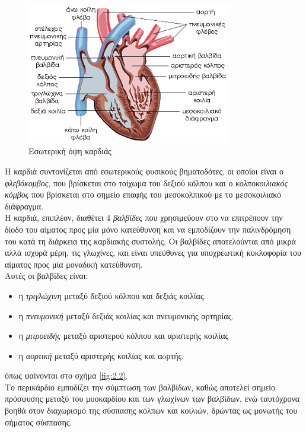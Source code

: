 \begin{figure}[H]
    \centering
    \includegraphics[width=0.8\textwidth]{misc/heart-anatomy.png}
    \caption{Εσωτερική όψη καρδιάς}
    \label{fig:2.1}
\end{figure}
\noindent Η καρδιά συντονίζεται από εσωτερικούς φυσικούς βηματοδότες, οι οποίοι είναι ο \emph{φλεβόκομβος}, που βρίσκεται στο τοίχωμα του δεξιού κόλπου και ο \emph{κολποκοιλιακός κόμβος} που βρίσκεται στο σημείο επαφής του μεσοκολπικού με το μεσοκοιλιακό διάφραγμα.
\\[0.5 \baselineskip]
Η καρδιά, επιπλέον, διαθέτει 4 \emph{βαλβίδες} που χρησιμεύουν στο να επιτρέπουν την δίοδο του αίματος προς μία μόνο κατεύθυνση και να εμποδίζουν την παλινδρόμηση του κατά τη διάρκεια της καρδιακής συστολής. Οι βαλβίδες αποτελούνται από μικρά αλλά ισχυρά μέρη, τις γλωχίνες, και είναι υπεύθυνες για υποχρεωτική κυκλοφορία του αίματος προς μία μοναδική κατεύθυνση.
\\
Αυτές οι βαλβίδες είναι:
\begin{itemize}
    \item η \emph{τριγλώχινη} μεταξύ δεξιού κόλπου και δεξιάς κοιλίας.
    \item η \emph{πνευμονική} μεταξύ δεξιάς κοιλίας και πνευμονικής αρτηρίας.
    \item η \emph{μιτροειδής} μεταξύ αριστερού κόλπου και αριστερής κοιλίας 
    \item η \emph{αορτική} μεταξύ αριστερής κοιλίας και αoρτής.
\end{itemize}
όπως φαίνονται στο σχήμα \ref{fig:2.2}.
\\ [0.5 \baselineskip]
Το περικάρδιο εμποδίζει την σύμπτωση των βαλβίδων, καθώς αποτελεί σημείο πρόσφυσης μεταξύ του μυοκαρδίου και των γλωχίνων των βαλβίδων, ενώ ταυτόχρονα βοηθά στον διαχωρισμό της σύσπασης κόλπων και κοιλιών, δρώντας ως μονωτής του σήματος σύσπασης. 
